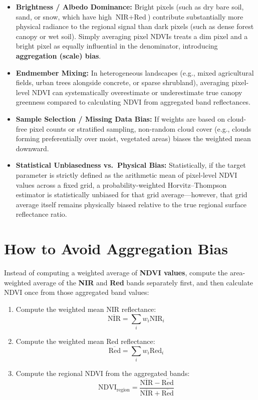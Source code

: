\documentclass[11pt,a4paper]{article}
\begin{document}
\begin{itemize}[leftmargin=*]
    \item \textbf{Brightness / Albedo Dominance:} Bright pixels (such as dry bare soil, sand, or snow, which have high $\text{NIR} + \text{Red}$) contribute substantially more physical radiance to the regional signal than dark pixels (such as dense forest canopy or wet soil). Simply averaging pixel NDVIs treats a dim pixel and a bright pixel as equally influential in the denominator, introducing \textbf{aggregation (scale) bias}.
    \item \textbf{Endmember Mixing:} In heterogeneous landscapes (e.g., mixed agricultural fields, urban trees alongside concrete, or sparse shrubland), averaging pixel-level NDVI can systematically overestimate or underestimate true canopy greenness compared to calculating NDVI from aggregated band reflectances.
    \item \textbf{Sample Selection / Missing Data Bias:} If weights are based on cloud-free pixel counts or stratified sampling, non-random cloud cover (e.g., clouds forming preferentially over moist, vegetated areas) biases the weighted mean downward.
    \item \textbf{Statistical Unbiasedness vs.\ Physical Bias:} Statistically, if the target parameter is strictly defined as the arithmetic mean of pixel-level NDVI values across a fixed grid, a probability-weighted Horvitz--Thompson estimator is statistically unbiased for that grid average---however, that grid average itself remains physically biased relative to the true regional surface reflectance ratio.
\end{itemize}

\section{How to Avoid Aggregation Bias}

Instead of computing a weighted average of \textbf{NDVI values}, compute the area-weighted average of the \textbf{NIR} and \textbf{Red} bands separately first, and then calculate NDVI once from those aggregated band values:

\begin{enumerate}[leftmargin=*]
    \item Compute the weighted mean NIR reflectance:
    \begin{equation}
    \overline{\text{NIR}} = \sum_{i} w_i \text{NIR}_i
    \end{equation}
    \item Compute the weighted mean Red reflectance:
    \begin{equation}
    \overline{\text{Red}} = \sum_{i} w_i \text{Red}_i
    \end{equation}
    \item Compute the regional NDVI from the aggregated bands:
    \begin{equation}
    \text{NDVI}_{\text{region}} = \frac{\overline{\text{NIR}} - \overline{\text{Red}}}{\overline{\text{NIR}} + \overline{\text{Red}}}
    \end{equation}
\end{enumerate}
\end{document}
